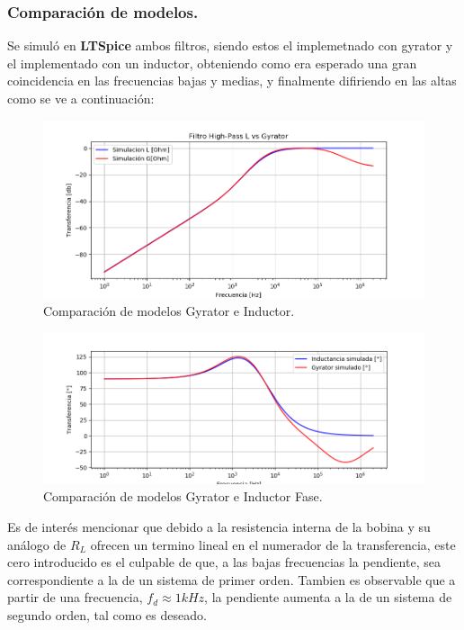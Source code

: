 \documentclass[a4paper]{article}
\begin{document}
\subsubsection{Comparación de modelos.}
Se simuló en \textbf{LTSpice} ambos filtros, siendo estos el implemetnado con gyrator y el implementado con un inductor, obteniendo como era esperado una gran coincidencia en las frecuencias bajas y medias, y finalmente difiriendo en las altas como se ve a continuación:
\begin{figure}[H]	
	\centering
	\includegraphics[width=\textwidth]{ImagenesEj2/simHP.PNG}
	\caption{Comparación de modelos Gyrator e Inductor.}
	\label{fig:gyrInd}
\end{figure}
\begin{figure}[H]	
	\centering
	\includegraphics[width=\textwidth]{ImagenesEj2/simHPP.PNG}
	\caption{Comparación de modelos Gyrator e Inductor Fase.}
	\label{fig:gyrIndP}
\end{figure}
Es de interés mencionar que debido a la resistencia interna de la bobina y su análogo de $R_L$ ofrecen un termino lineal en el numerador de la transferencia, este cero introducido es el culpable de que, a las bajas frecuencias la pendiente, sea correspondiente a la de un sistema de primer orden. Tambien es observable que a partir de una frecuencia, $f_d \approx 1kHz $, la pendiente aumenta a la de un sistema de segundo orden, tal como es deseado.
\end{document}
